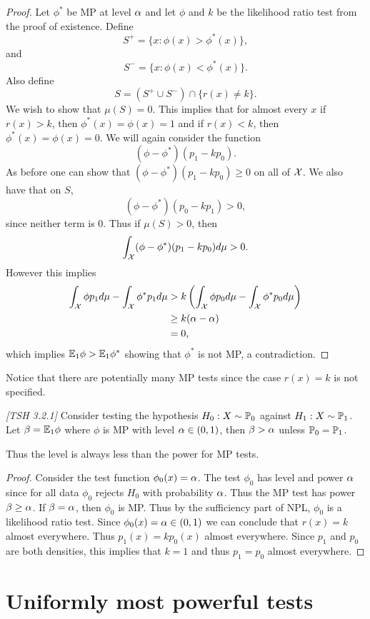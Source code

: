 \begin{proof}
    Let $\phi^*$ be MP at level ${\alpha}$ and let $\phi$ and $k$ be the likelihood ratio test from the proof of existence. Define
    \[S^+ = \{x : \phi(x)> \phi^*(x)\}, \]
    and
    \[S^- = \{x : \phi(x) < \phi^*(x)\}.\]
    Also define 
    \[S = (S^+\cup S^-) \cap \{r(x)\neq k\}. \]
    We wish to show that $\mu(S) =0$. This implies that for almost every $x$ if $r(x) > k$, then $\phi^*(x)=\phi(x)=1$ and if $r(x)<k$, then $\phi^*(x)=\phi(x)=0$. We will again consider the function 
    \[(\phi-\phi^*)(p_1-kp_0). \]
    As before one can show that $(\phi-\phi^*)(p_1-kp_0) \ge 0$ on all of ${\mathcal{X}}$. We also have that on $S$, 
    \[(\phi-\phi^*)(p_0-kp_1)>0, \]
    since neither term is 0. Thus if $\mu(S) > 0$, then 
    \[\int_{\mathcal{X}}(\phi-\phi^*)(p_1-kp_0)d\mu > 0. \]
    However this implies 
    \begin{align*}
        \int_{\mathcal{X}} \phi p_1d\mu -\int_{\mathcal{X}} \phi^* p_1d\mu&> k \left(\int_{\mathcal{X}} \phi p_0d\mu - \int_{\mathcal{X}} \phi^* p_0d\mu\right) \\
        &\ge k({\alpha}-{\alpha})\\
        &=0,
    \end{align*}
    which implies ${\mathbb{E}}_1 \phi > {\mathbb{E}}_1 \phi^*$ showing that $\phi^*$ is not MP, a contradiction.
\end{proof}
Notice that there are potentially many MP tests since the case $r(x)=k$ is not specified. 
\begin{cor}
    \emph{[TSH 3.2.1]} Consider testing the hypothesis $H_0 : X\sim {\mathbb{P}}_0$ against $H_1 : X\sim {\mathbb{P}}_1$. Let $\beta = {\mathbb{E}}_1 \phi$ where $\phi$ is MP with level ${\alpha} \in (0,1)$, then $\beta > {\alpha}$ unless ${\mathbb{P}}_0 ={\mathbb{P}}_1$.
\end{cor}
Thus the level is always less than the power for MP tests.
\begin{proof}
    Consider the test function $\phi_0(x) = {\alpha}$. The test $\phi_0$ has level and power ${\alpha}$ since for all data $\phi_0$ rejects $H_0$ with probability ${\alpha}$. Thus the MP test has power $\beta \ge {\alpha}$. If $\beta = {\alpha}$, then $\phi_0$ is MP. Thus by the sufficiency part of NPL, $\phi_0$ is a likelihood ratio test. Since $\phi_0(x) = {\alpha} \in (0,1)$ we can conclude that $r(x) = k$ almost everywhere. Thus $p_1(x) = kp_0(x)$ almost everywhere. Since $p_1$ and $p_0$ are both densities, this implies that $k=1$ and thus $p_1=p_0$ almost everywhere.
\end{proof}
\section{Uniformly most powerful tests}
